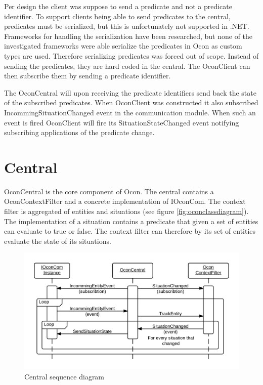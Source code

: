 \documentclass[../report.tex]{subfiles}
\begin{document}
Per design the client was suppose to send a predicate and not a predicate identifier. To support clients being able to send predicates to the central, predicates must be serialized, but this is unfortunately not supported in .NET. Frameworks for handling the serialization have been researched, but none of the investigated frameworks were able serialize the predicates in Ocon as custom types are used. Therefore serializing predicates was forced out of scope. Instead of sending the predicates, they are hard coded in the central. The OconClient can then subscribe them by sending a predicate identifier. 

The OconCentral will upon receiving the predicate identifiers send back the state of the subscribed predicates. When OconClient was constructed it also subscribed IncommingSituationChanged event in the communication module. When such an event is fired OconClient will fire its SituationStateChanged event notifying subscribing applications of the predicate change.


\section{Central}
OconCentral is the core component of Ocon. The central contains a OconContextFilter and a concrete implementation of IOconCom. The context filter is aggregated of entities and situations (see figure \ref{fig:oconclassdiagram}). The implementation of a situation contains a predicate that given a set of entities can evaluate to true or false. The context filter can therefore by its set of entities evaluate the state of its situations.

\begin{figure}
\centering
\includegraphics[width=\linewidth]{sequencediagram-central.png}
\caption{Central sequence diagram}
\label{fig:seqcentral}
\end{figure}
\end{document}
